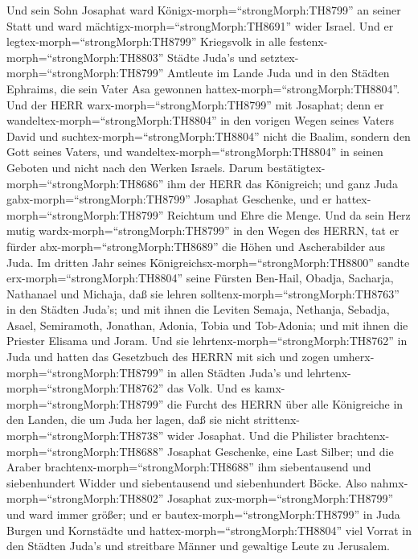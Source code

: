  Und sein Sohn Josaphat ward
Königx-morph=``strongMorph:TH8799'' an seiner Statt und ward
mächtigx-morph=``strongMorph:TH8691'' wider Israel.  Und er
legtex-morph=``strongMorph:TH8799'' Kriegsvolk in alle
festenx-morph=``strongMorph:TH8803'' Städte Juda's und
setztex-morph=``strongMorph:TH8799'' Amtleute im Lande Juda und in den
Städten Ephraims, die sein Vater Asa gewonnen
hattex-morph=``strongMorph:TH8804''.  Und der HERR
warx-morph=``strongMorph:TH8799'' mit Josaphat; denn er
wandeltex-morph=``strongMorph:TH8804'' in den vorigen Wegen seines
Vaters David und suchtex-morph=``strongMorph:TH8804'' nicht die Baalim,
 sondern den Gott seines Vaters, und
wandeltex-morph=``strongMorph:TH8804'' in seinen Geboten und nicht nach
den Werken Israels.  Darum
bestätigtex-morph=``strongMorph:TH8686'' ihm der HERR das Königreich;
und ganz Juda gabx-morph=``strongMorph:TH8799'' Josaphat Geschenke, und
er hattex-morph=``strongMorph:TH8799'' Reichtum und Ehre die Menge.
 Und da sein Herz mutig wardx-morph=``strongMorph:TH8799''
in den Wegen des HERRN, tat er fürder abx-morph=``strongMorph:TH8689''
die Höhen und Ascherabilder aus Juda.  Im dritten Jahr
seines Königreichsx-morph=``strongMorph:TH8800'' sandte
erx-morph=``strongMorph:TH8804'' seine Fürsten Ben-Hail, Obadja,
Sacharja, Nathanael und Michaja, daß sie lehren
solltenx-morph=``strongMorph:TH8763'' in den Städten Juda's;
 und mit ihnen die Leviten Semaja, Nethanja, Sebadja, Asael,
Semiramoth, Jonathan, Adonia, Tobia und Tob-Adonia; und mit ihnen die
Priester Elisama und Joram.  Und sie
lehrtenx-morph=``strongMorph:TH8762'' in Juda und hatten das Gesetzbuch
des HERRN mit sich und zogen umherx-morph=``strongMorph:TH8799'' in
allen Städten Juda's und lehrtenx-morph=``strongMorph:TH8762'' das Volk.
 Und es kamx-morph=``strongMorph:TH8799'' die Furcht des
HERRN über alle Königreiche in den Landen, die um Juda her lagen, daß
sie nicht strittenx-morph=``strongMorph:TH8738'' wider Josaphat.
 Und die Philister brachtenx-morph=``strongMorph:TH8688''
Josaphat Geschenke, eine Last Silber; und die Araber
brachtenx-morph=``strongMorph:TH8688'' ihm siebentausend und
siebenhundert Widder und siebentausend und siebenhundert Böcke.
 Also nahmx-morph=``strongMorph:TH8802'' Josaphat
zux-morph=``strongMorph:TH8799'' und ward immer größer; und er
bautex-morph=``strongMorph:TH8799'' in Juda Burgen und Kornstädte
 und hattex-morph=``strongMorph:TH8804'' viel Vorrat in den
Städten Juda's und streitbare Männer und gewaltige Leute zu Jerusalem.

